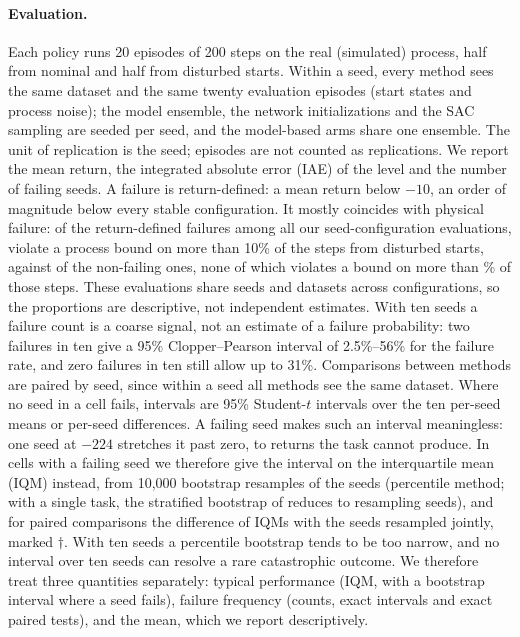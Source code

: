 \documentclass[11pt]{article}
\begin{document}
\paragraph{Evaluation.} Each policy runs 20 episodes of 200 steps on the real (simulated) process, half from nominal and half from disturbed starts. Within a seed, every method sees the same dataset and the same twenty evaluation episodes (start states and process noise); the model ensemble, the network initializations and the SAC sampling are seeded per seed, and the model-based arms share one ensemble. The unit of replication is the seed; episodes are not counted as replications. We report the mean return, the integrated absolute error (IAE) of the level and the number of failing seeds. A failure is return-defined: a mean return below $-10$, an order of magnitude below every stable configuration. It mostly coincides with physical failure: of the \nfailall{} return-defined failures among all our seed-configuration evaluations, \failviol{} violate a process bound on more than 10\% of the steps from disturbed starts, against \okviol{} of the \nokall{} non-failing ones, none of which violates a bound on more than \okviolmax\% of those steps. These evaluations share seeds and datasets across configurations, so the proportions are descriptive, not independent estimates. With ten seeds a failure count is a coarse signal, not an estimate of a failure probability: two failures in ten give a 95\% Clopper--Pearson interval of 2.5\%--56\% for the failure rate, and zero failures in ten still allow up to 31\%. Comparisons between methods are paired by seed, since within a seed all methods see the same dataset. Where no seed in a cell fails, intervals are 95\% Student-$t$ intervals over the ten per-seed means or per-seed differences. A failing seed makes such an interval meaningless: one seed at $-224$ stretches it past zero, to returns the task cannot produce. In cells with a failing seed we therefore give the interval on the interquartile mean (IQM) instead, from 10{,}000 bootstrap resamples of the seeds (percentile method; with a single task, the stratified bootstrap of \citet{agarwal2021precipice} reduces to resampling seeds), and for paired comparisons the difference of IQMs with the seeds resampled jointly, marked $\dagger$. With ten seeds a percentile bootstrap tends to be too narrow, and no interval over ten seeds can resolve a rare catastrophic outcome. We therefore treat three quantities separately: typical performance (IQM, with a bootstrap interval where a seed fails), failure frequency (counts, exact intervals and exact paired tests), and the mean, which we report descriptively.
\end{document}
